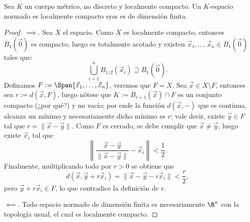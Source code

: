 \documentclass[topologia-analisis.tex]{subfiles}
\begin{document}

\begin{thm}
	Sea $K$ un cuerpo métrico, no discreto y localmente compacto.
	Un $K$-espacio normado es localmente compacto syss es de dimensión finita.
\end{thm}
\begin{proof}
	$\implies$. Sea $X$ el espacio. Como $X$ es localmente compacto, entonces $\overline B_1( \Vec 0 )$ es compacto, luego es totalmente acotado
	y existen $\vec x_1, \dots, \vec x_n \in \overline B_1(\Vec 0)$ tales que:
	$$ \bigcup_{i=1}^n B_{1/2}(\vec x_i) \supseteq \overline B_1(\Vec 0). $$
	Definamos $F := \Span\{ \vec x_1, \dots, \vec x_n \}$, veremos que $F = X$.
	Sea $\vec x \in X \setminus F$, entonces sea $r := d(\vec x, F)$, luego nótese que $K := \overline B_{r+1}(\vec x) \cap F$ es un conjunto
	compacto (¿por qué?) y no vacío; por ende la función $d(\vec x, -)$ que es continua, alcanza un mínimo y necesariamente dicho mínimo es $r$;
	vale decir, existe $\vec y \in F$ tal que $r = \|\vec x - \vec y\|$.
	Como $F$ es cerrado, se debe cumplir que $\vec x \ne \vec y$, luego existe $\vec x_i$ tal que
	$$ \left\| \frac{\vec x - \vec y}{\|\vec x - \vec y\|} - \vec x_i \right\| < \frac{1}{2}. $$
	Finalmente, multiplicando todo por $r > 0$ se obtiene que
	$$ d(\vec x, \vec y + r\vec x_i) = \|\vec x - \vec y - r\vec x_i\| < \frac{r}{2}, $$
	pero $\vec y + r\vec x_i \in F$, lo que contradice la definición de $r$.
	\par
	$\impliedby$. Todo espacio normado de dimensión finita es necesariamente $\R^n$ con la topología usual, el cual es localmente compacto.
\end{proof}
\end{document}
